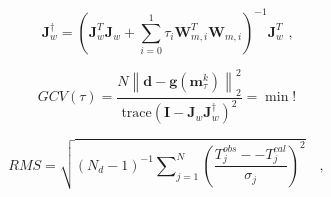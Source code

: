 \[{\mathbf{J}}_w^\dag  = {\left( {{\mathbf{J}}_w^T{\mathbf{J}}_w^{} + \sum\limits_{i = 0}^1 {{\tau _i}} {\mathbf{W}}_{m,i}^T{\mathbf{W}}_{m,i}^{}} \right)^{ - 1}}{\mathbf{J}}_w^T{\text{  ,}}\]%

\[GCV(\tau ) = \frac{{N\left\| {{\mathbf{d}} - {\mathbf{g}}({\mathbf{m}}_\tau ^k)} \right\|_2^2}}{{{\text{trace}}{{({\mathbf{I}} - {\mathbf{J}}_w^{}{\mathbf{J}}_w^\dag )}^2}}} = \min !\]%


\[RMS = \sqrt {\left( {{N_d} - 1} \right)_{}^{ - 1}\sum\nolimits_{j = 1}^N {{{\left( {\frac{{T_j^{obs}--T_j^{cal}}}{{{\sigma _j}}}} \right)}^2}} } \quad ,\]%


